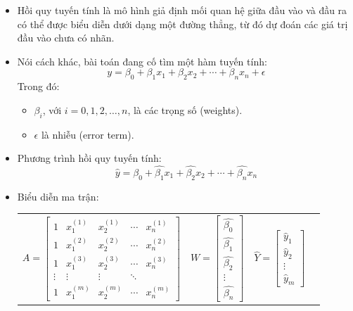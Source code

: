 \documentclass[final,letterpaper,twoside,12pt]{report}
\begin{document}
\begin{itemize}
	\item Hồi quy tuyến tính là mô hình giả định mối quan hệ giữa đầu vào và đầu ra có thể được biểu diễn dưới dạng một đường thẳng, từ đó dự đoán các giá trị đầu vào chưa có nhãn.
	\item Nói cách khác, bài toán đang cố tìm một hàm tuyến tính:
	      $$
		      y = \beta_0 + \beta_1x_1 + \beta_2x_2 + \cdots + \beta_nx_n + \epsilon
	      $$
	      Trong đó:
	      \begin{itemize}
		      \item $\beta_i$, với $i = 0, 1, 2, \dots, n$, là các trọng số (weights).
		      \item $\epsilon$ là nhiễu (error term).
	      \end{itemize}
	\item Phương trình hồi quy tuyến tính:
	      $$
		      \hat{y} = \hat{\beta_0} + \hat{\beta_1}x_1 + \hat{\beta_2}x_2 + \cdots + \hat{\beta_n}x_n
	      $$
	\item Biểu diễn ma trận:
	      \begin{center}
		      \begin{tabular}{cccc}
			      $A = \begin{bmatrix}
					           1      & x_1^{(1)} & x_2^{(1)} & \cdots & x_n^{(1)} \\
					           1      & x_1^{(2)} & x_2^{(2)} & \cdots & x_n^{(2)} \\
					           1      & x_1^{(3)} & x_2^{(3)} & \cdots & x_n^{(3)} \\
					           \vdots & \vdots    & \vdots    & \ddots             \\
					           1      & x_1^{(m)} & x_2^{(m)} & \cdots & x_n^{(m)}
				           \end{bmatrix}$                                  &
			      $W = \begin{bmatrix}
					           \hat{\beta_0} \\ \hat{\beta_1} \\ \hat{\beta_2} \\ \vdots \\ \hat{\beta_n}
				           \end{bmatrix}$              &
			      $\hat{Y} = \begin{bmatrix} \hat{y}_1 \\ \hat{y}_2 \\ \vdots \\ \hat{y}_m \end{bmatrix}$ &

\end{tabular}
\end{center}
\end{itemize}
\end{document}
